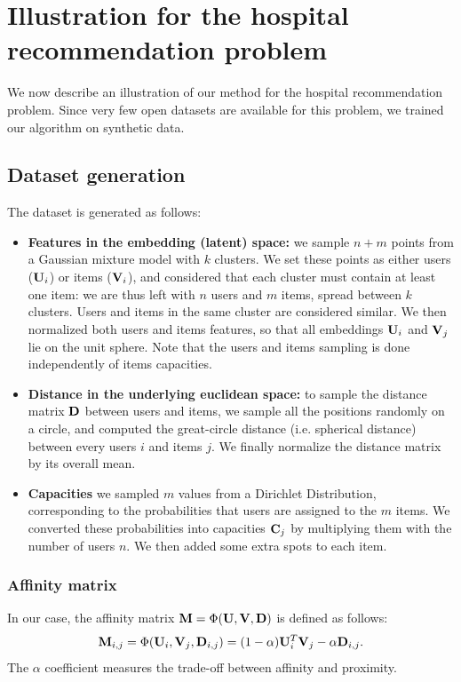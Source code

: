\section{Illustration for the hospital recommendation problem}
We now describe an illustration of our method for the hospital recommendation problem. Since very few open datasets are available for this problem, we trained our algorithm on synthetic data.

\subsection*{Dataset generation}
The dataset is generated as follows:
\begin{itemize}
    \item \textbf{Features in the embedding (latent) space:} we sample $n+m$ points from a Gaussian mixture model with $k$ clusters. We set these points as either users ($\mathbf{U}_i$) or items ($\mathbf{V}_i$), and considered that each cluster must contain at least one item: we are thus left with $n$ users and $m$ items, spread between $k$ clusters. Users and items in the same cluster are considered similar. We then normalized both users and items features, so that all embeddings $\mathbf{U}_i$ and $\mathbf{V}_j$ lie on the unit sphere. Note that the users and items sampling is done independently of items capacities.

    \item \textbf{Distance in the underlying euclidean space:} to sample the distance matrix $\mathbf{D}$ between users and items, we sample all the positions randomly on a circle, and computed the great-circle distance (i.e. spherical distance) between every users $i$ and items $j$. We finally normalize the distance matrix by its overall mean.

    \item \textbf{Capacities} we sampled $m$ values from a Dirichlet Distribution, corresponding to the probabilities that users are assigned to the $m$ items. We converted these probabilities into capacities $\mathbf{C}_j$ by multiplying them with the number of users $n$. We then added some extra spots to each item.
\end{itemize}

\subsubsection*{Affinity matrix}
In our case, the affinity matrix $\mathbf{M}=\Phi(\mathbf{U},\mathbf{V},\mathbf{D})$ is defined as follows:
\begin{equation}\label{eq:phi_def_illustration}
    \mathbf{M}_{i,j}=\Phi(\mathbf{U}_i,\mathbf{V}_j,\mathbf{D}_{i,j}) = (1-\alpha) \mathbf{U}_i^T \mathbf{V}_j - \alpha \mathbf{D}_{i,j}.
\end{equation} The $\alpha$ coefficient measures the trade-off between affinity and proximity.

